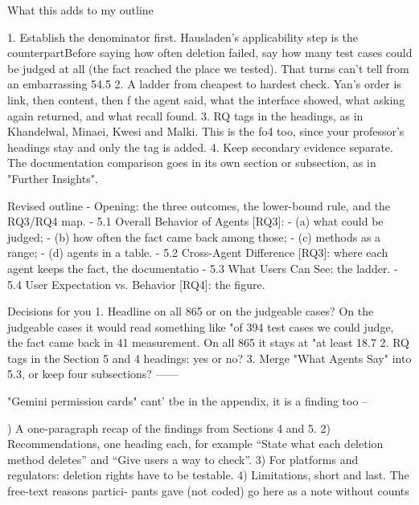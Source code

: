 What this adds to my outline

1. Establish the denominator first. Hausladen's applicability step is the counterpartBefore saying how often deletion failed, say how many test cases could be judged at all (the fact reached the place we tested). That turns can't tell from an embarrassing 54.5%
2. A ladder from cheapest to hardest check. Yan's order is link, then content, then f the agent said, what the interface showed, what asking again returned, and what recall found.
3. RQ tags in the headings, as in Khandelwal, Minaei, Kwesi and Malki. This is the fo4 too, since your professor's headings stay and only the tag is added.
4. Keep secondary evidence separate. The documentation comparison goes in its own section or subsection, as in "Further Insights".

Revised outline
- Opening: the three outcomes, the lower-bound rule, and the RQ3/RQ4 map.
- 5.1 Overall Behavior of Agents [RQ3]:
  - (a) what could be judged;
  - (b) how often the fact came back among those;
  - (c) methods as a range;
  - (d) agents in a table.
- 5.2 Cross-Agent Difference [RQ3]: where each agent keeps the fact, the documentatio
- 5.3 What Users Can See: the ladder.
- 5.4 User Expectation vs. Behavior [RQ4]: the figure.

Decisions for you
1. Headline on all 865 or on the judgeable cases? On the judgeable cases it would read something like "of 394 test cases we could judge, the fact came back in 41%
   measurement. On all 865 it stays at "at least 18.7%
2. RQ tags in the Section 5 and 4 headings: yes or no?
3. Merge "What Agents Say" into 5.3, or keep four subsections?
------

"Gemini permission cards" cant' tbe in the appendix, it is a finding too
--

) A one-paragraph recap of the findings from Sections 4
and 5.
2) Recommendations, one heading each, for example “State
what each deletion method deletes” and “Give users a
way to check”.
3) For platforms and regulators: deletion rights have to be
testable.
4) Limitations, short and last. The free-text reasons partici-
pants gave (not coded) go here as a note without counts

